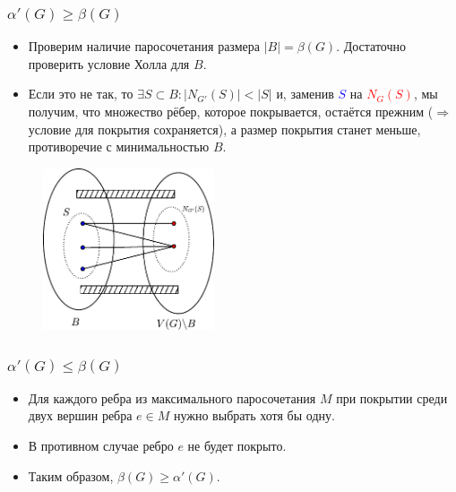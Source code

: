 \begin{frame}[t]
    \small
    \frametitle{$\alpha'(G) \geq \beta(G)$}
    \begin{itemize}
        \item Проверим наличие паросочетания размера $|B| = \beta(G)$. Достаточно проверить условие Холла для $B$.
        \item Если это не так, то $\exists S \subset B: |N_{G'}(S)| < |S|$ и, заменив \textcolor{blue}{$S$} на \textcolor{red}{$N_G(S)$}, мы получим, что множество рёбер, которое покрывается, остаётся прежним ($ \Rightarrow $ условие для покрытия сохраняется), а размер покрытия станет меньше, противоречие с минимальностью $B$. 
    \end{itemize}
    \vspace{-5mm}
    \begin{figure}[h]
        \centering
        \includegraphics[width=0.45\textwidth]{images/hall}
        \label{fig:hall}
    \end{figure}
    
\end{frame}

\begin{frame}[t]
    \small
    \frametitle{$\alpha'(G) \leq \beta(G)$}

    \begin{itemize}
        \item Для каждого ребра из максимального паросочетания $M$ при покрытии среди двух вершин ребра $e \in M$ нужно выбрать хотя бы одну.
        \item В противном случае ребро $e$ не будет покрыто.
        \item Таким образом, $\beta(G) \geq \alpha' (G)$. 
    \end{itemize}
    \hfill \qedsymbol
\end{frame}

